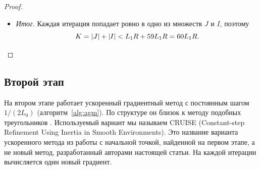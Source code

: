 \documentclass[11pt,a4paper]{article}
\newcommand{\norm}[1]{\|#1\|}
\newcommand{\by}[2]{\mathrel{\underset{#2}{#1}}}
\newcommand{\bypad}[3]{\mathrel{\underset{\mathmakebox[\widthof{$\scriptstyle#3$}]{#2}}{#1}}}
\begin{document}
\begin{proof}
\begin{itemize}
\begin{align*}
 &\bypad{=}{}{\eqref{eq:count-anchor-budget}}\sqrt{L_1R}+2+\log448+2\log(L_1R)\\
 &\bypad{<}{(\mathrm в)}{\eqref{eq:count-anchor-budget}}5\sqrt{L_1R}+\frac92
 \by{\le}{L_1R\ge1}\frac{19}2\sqrt{L_1R} .
\end{align*}
Здесь (в) --- неравенства $\log448<13/2$ и $\log t\le2\sqrt t-2$ при $t\ge1$.
Сложим неравенства~\eqref{eq:count-two-groups} по $i\in I$. Первые слагаемые в сумме не больше $2\sqrt7\sqrt{L_0A_K}<16\sqrt7L_1R$. Ко вторым применим неравенство Гёльдера с показателями $3$ и $3/2$:
\begin{align*}
 |I|
 &<16\sqrt7L_1R+7^{2/3}\sum_{i\in I}\bigl(L_1a_i\norm{\nabla f(y^i)}\bigr)^{2/3}\Bigl(\frac{a_i}{A_i}\Bigr)^{2/3}\\
 &\bypad{\le}{}{\eqref{eq:count-anchor-budget}}16\sqrt7L_1R+7^{2/3}\Bigl(\sum_{i\in I}L_1^2a_i^2\norm{\nabla f(y^i)}^2\Bigr)^{1/3}\Bigl(\sum_{i\in I}\frac{a_i}{A_i}\Bigr)^{2/3}\\
 &\by{<}{\eqref{eq:count-anchor-budget}}16\sqrt7L_1R+7^{2/3}(L_1R)^{2/3}\Bigl(\frac{19}2\sqrt{L_1R}\Bigr)^{2/3}\\
 &\bypad{=}{}{\eqref{eq:count-anchor-budget}}\Bigl(16\sqrt7+\Bigl(\frac{133}2\Bigr)^{2/3}\Bigr)L_1R\\
 &\bypad{<}{(\mathrm г)}{\eqref{eq:count-anchor-budget}}59L_1R .
\end{align*}
Здесь (г) --- неравенства $16\sqrt7<42{,}4$ и $(133/2)^{2/3}<16{,}5$, равносильные $1792<42{,}4^2$ и $133^2<4\cdot16{,}5^3$.
\item \emph{Итог.} Каждая итерация попадает ровно в одно из множеств $J$ и $I$, поэтому
\[
 K=|J|+|I|<L_1R+59L_1R=60L_1R .\qedhere
\]
\end{itemize}
\end{proof}

\subsection{Второй этап}\label{sec:upper-second}

На втором этапе работает ускоренный градиентный метод с постоянным шагом $1/(2L_0)$ \citep[алгоритм~1]{tyurin2026accelerated} (алгоритм~\ref{alg:agm}). По структуре он близок к методу подобных треугольников \citep{gasnikov2018universal}. Используемый вариант мы называем CRUISE (Constant-step Refinement Using Inertia in Smooth Environments). Это название варианта ускоренного метода из работы \citet{tyurin2026accelerated} с начальной точкой, найденной на первом этапе, а не новый метод, разработанный авторами настоящей статьи. На каждой итерации вычисляется один новый градиент.
\end{document}

